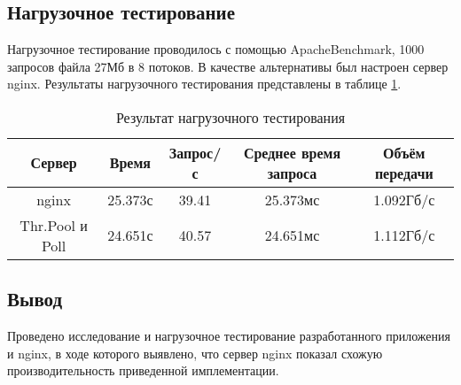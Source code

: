 \subsection{Нагрузочное тестирование}

Нагрузочное тестирование проводилось с помощью ApacheBenchmark, 1000 запросов файла 27Мб в 8 потоков. 
В качестве альтернативы был настроен сервер nginx. 
Результаты нагрузочного тестирования представлены в таблице \ref{tab:bench}.

\begin{table}[h]
	\begin{center}
		\caption{Результат нагрузочного тестирования}
		\label{tab:bench}
		\begin{tabular}{|c|c|c|c|c|}
			\hline
			Сервер & Время & Запрос/с & Среднее время запроса & Объём передачи\\
			\hline
			nginx & 25.373с & 39.41 & 25.373мс & 1.092Гб/с \\ \hline
			Thr.Pool и Poll & 24.651с & 40.57 & 24.651мс & 1.112Гб/с \\ \hline
		\end{tabular}
	\end{center}
\end{table}

\clearpage

\subsection*{Вывод}

Проведено исследование и нагрузочное тестирование разработанного приложения и nginx, в ходе которого выявлено, что сервер nginx показал схожую производительность приведенной имплементации.

